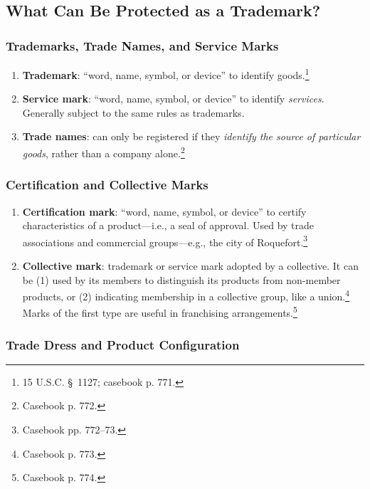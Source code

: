 \subsection{What Can Be Protected as a Trademark?}

\subsubsection{Trademarks, Trade Names, and Service Marks}

\begin{enumerate}
    \item \textbf{Trademark}: ``word, name, symbol, or device'' to identify 
    goods.\footnote{15 U.S.C. \S\ 1127; casebook p. 771.}
    \item \textbf{Service mark}: ``word, name, symbol, or device'' to identify 
    \emph{services}. Generally subject to the same rules as trademarks.
    \item \textbf{Trade names}: can only be registered if they \emph{identify 
    the source of particular goods}, rather than a company 
    alone.\footnote{Casebook p. 772.}
\end{enumerate}

\subsubsection{Certification and Collective Marks}

\begin{enumerate}
    \item \textbf{Certification mark}: ``word, name, symbol, or device'' to 
    certify characteristics of a product---i.e., a seal of approval. Used by 
    trade associations and commercial groups---e.g., the city of 
    Roquefort.\footnote{Casebook pp. 772--73.}
    \item \textbf{Collective mark}: trademark or service mark adopted by a 
    collective. It can be (1) used by its members to distinguish its products 
    from non-member products, or (2) indicating membership in a collective 
    group, like a union.\footnote{Casebook p. 773.} Marks of the first type 
    are useful in franchising arrangements.\footnote{Casebook p. 774.}
\end{enumerate}

\subsubsection{Trade Dress and Product Configuration}

